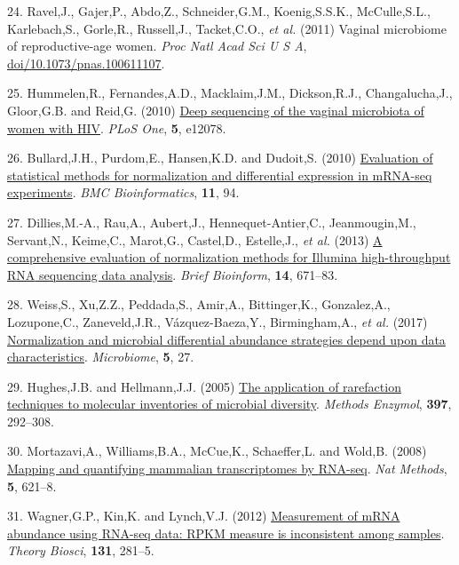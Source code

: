 \documentclass[
]{article}
\newlength{\cslhangindent}
\newenvironment{CSLReferences}[2] %
 {\begin{list}{}{%
  \setlength{\itemindent}{0pt}
  \setlength{\leftmargin}{0pt}
  \setlength{\parsep}{0pt}
  \ifodd #1
   \setlength{\leftmargin}{\cslhangindent}
   \setlength{\itemindent}{-1\cslhangindent}
  \fi
  \setlength{\itemsep}{#2\baselineskip}}}
 {\end{list}}
\begin{document}
\begin{CSLReferences}{1}{1}
24. Ravel,J., Gajer,P., Abdo,Z., Schneider,G.M., Koenig,S.S.K.,
McCulle,S.L., Karlebach,S., Gorle,R., Russell,J., Tacket,C.O., \emph{et
al.} (2011) Vaginal microbiome of reproductive-age women. \emph{Proc
Natl Acad Sci U S A},
\href{https://doi.org/doi/10.1073/pnas.100611107}{doi/10.1073/pnas.100611107}.

25. Hummelen,R., Fernandes,A.D., Macklaim,J.M., Dickson,R.J.,
Changalucha,J., Gloor,G.B. and Reid,G. (2010)
\href{https://doi.org/10.1371/journal.pone.0012078}{Deep sequencing of
the vaginal microbiota of women with {HIV}}. \emph{PLoS One},
\textbf{5}, e12078.

26. Bullard,J.H., Purdom,E., Hansen,K.D. and Dudoit,S. (2010)
\href{https://doi.org/10.1186/1471-2105-11-94}{Evaluation of statistical
methods for normalization and differential expression in m{RNA-seq}
experiments}. \emph{BMC Bioinformatics}, \textbf{11}, 94.

27. Dillies,M.-A., Rau,A., Aubert,J., Hennequet-Antier,C.,
Jeanmougin,M., Servant,N., Keime,C., Marot,G., Castel,D., Estelle,J.,
\emph{et al.} (2013) \href{https://doi.org/10.1093/bib/bbs046}{A
comprehensive evaluation of normalization methods for {Illumina}
high-throughput {RNA} sequencing data analysis}. \emph{Brief Bioinform},
\textbf{14}, 671--83.

28. Weiss,S., Xu,Z.Z., Peddada,S., Amir,A., Bittinger,K., Gonzalez,A.,
Lozupone,C., Zaneveld,J.R., Vázquez-Baeza,Y., Birmingham,A., \emph{et
al.} (2017)
\href{https://doi.org/10.1186/s40168-017-0237-y}{Normalization and
microbial differential abundance strategies depend upon data
characteristics}. \emph{Microbiome}, \textbf{5}, 27.

29. Hughes,J.B. and Hellmann,J.J. (2005)
\href{https://doi.org/10.1016/S0076-6879(05)97017-1}{The application of
rarefaction techniques to molecular inventories of microbial diversity}.
\emph{Methods Enzymol}, \textbf{397}, 292--308.

30. Mortazavi,A., Williams,B.A., McCue,K., Schaeffer,L. and Wold,B.
(2008) \href{https://doi.org/10.1038/nmeth.1226}{Mapping and quantifying
mammalian transcriptomes by {RNA-seq}}. \emph{Nat Methods}, \textbf{5},
621--8.

31. Wagner,G.P., Kin,K. and Lynch,V.J. (2012)
\href{https://doi.org/10.1007/s12064-012-0162-3}{Measurement of mRNA
abundance using RNA-seq data: RPKM measure is inconsistent among
samples}. \emph{Theory Biosci}, \textbf{131}, 281--5.


\end{CSLReferences}
\end{document}
